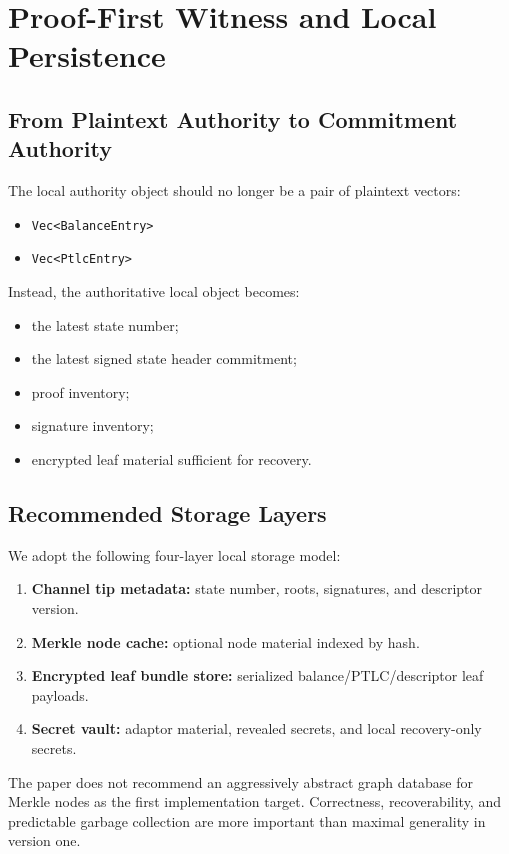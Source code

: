 \documentclass[11pt,a4paper]{article}
\newcommand{\code}[1]{\texttt{#1}}
\begin{document}
\section{Proof-First Witness and Local Persistence}

\subsection{From Plaintext Authority to Commitment Authority}

The local authority object should no longer be a pair of plaintext vectors:
\begin{itemize}
    \item \code{Vec<BalanceEntry>}
    \item \code{Vec<PtlcEntry>}
\end{itemize}

Instead, the authoritative local object becomes:
\begin{itemize}
    \item the latest state number;
    \item the latest signed state header commitment;
    \item proof inventory;
    \item signature inventory;
    \item encrypted leaf material sufficient for recovery.
\end{itemize}

\subsection{Recommended Storage Layers}

We adopt the following four-layer local storage model:
\begin{enumerate}
    \item \textbf{Channel tip metadata:} state number, roots, signatures, and descriptor version.
    \item \textbf{Merkle node cache:} optional node material indexed by hash.
    \item \textbf{Encrypted leaf bundle store:} serialized balance/PTLC/descriptor leaf payloads.
    \item \textbf{Secret vault:} adaptor material, revealed secrets, and local recovery-only secrets.
\end{enumerate}

The paper does not recommend an aggressively abstract graph database for Merkle nodes as the first implementation target. Correctness, recoverability, and predictable garbage collection are more important than maximal generality in version one.
\end{document}
